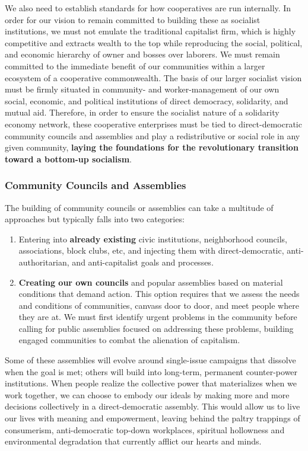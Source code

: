 \documentclass[10pt]{memoir}
\begin{document}
We also need to establish standards for how cooperatives are run
internally. In order for our vision to remain committed to building
these as socialist institutions, we must not emulate the traditional
capitalist firm, which is highly competitive and extracts wealth to the
top while reproducing the social, political, and economic hierarchy of
owner and bosses over laborers. We must remain committed to the
immediate benefit of our communities within a larger ecosystem of a
cooperative commonwealth. The basis of our larger socialist vision must
be firmly situated in community- and worker-management of our own
social, economic, and political institutions of direct democracy,
solidarity, and mutual aid. Therefore, in order to ensure the socialist
nature of a solidarity economy network, these cooperative enterprises
must be tied to direct-democratic community councils and assemblies and
play a redistributive or social role in any given community,
\textbf{laying the foundations for the revolutionary transition toward a
bottom-up socialism}.

\subsubsection{Community Councils and
Assemblies}\label{community-councils-and-assemblies}

The building of community councils or assemblies can take a multitude of
approaches but typically falls into two categories:

\begin{enumerate}
\def\labelenumi{\arabic{enumi}.}
\itemsep1pt\parskip0pt
\item
  Entering into \textbf{already existing} civic institutions,
  neighborhood councils, associations, block clubs, etc, and injecting
  them with direct-democratic, anti-authoritarian, and anti-capitalist
  goals and processes.
\item
  \textbf{Creating our own councils} and popular assemblies based on
  material conditions that demand action. This option requires that we
  assess the needs and conditions of communities, canvass door to door,
  and meet people where they are at. We must first identify urgent
  problems in the community before calling for public assemblies focused
  on addressing these problems, building engaged communities to combat
  the alienation of capitalism.
\end{enumerate}

Some of these assemblies will evolve around single-issue campaigns that
dissolve when the goal is met; others will build into long-term,
permanent counter-power institutions. When people realize the collective
power that materializes when we work together, we can choose to embody
our ideals by making more and more decisions collectively in a
direct-democratic assembly. This would allow us to live our lives with
meaning and empowerment, leaving behind the paltry trappings of
consumerism, anti-democratic top-down workplaces, spiritual hollowness
and environmental degradation that currently afflict our hearts and
minds.
\end{document}
